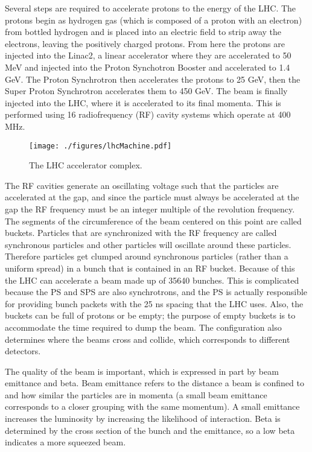 Several steps are required to accelerate protons to the energy of the LHC.  The protons begin as hydrogen gas (which is composed of a proton with an electron) from bottled hydrogen and is placed into an electric field to strip away the electrons, leaving the positively charged protons.  From here the protons are injected into the Linac2, a linear accelerator where they are accelerated to 50 MeV and injected into the Proton Synchotron Booster and accelerated to 1.4 GeV.  The Proton Synchrotron then accelerates the protons to 25 GeV, then the Super Proton Synchrotron accelerates them to 450 GeV.  The beam is finally injected into the LHC, where it is accelerated to its final momenta.  This is performed using 16 radiofrequency (RF) cavity systems which operate at 400 MHz.  

\begin{figure}[h!]
  \centering
	\texttt{[image: ./figures/lhcMachine.pdf]}
\caption{\label{fig:lhcMachine}{ The LHC accelerator complex. }}
\end{figure}

The RF cavities generate an oscillating voltage such that the particles are accelerated at the gap, and since the particle must always be accelerated at the gap the RF frequency must be an integer multiple of the revolution frequency.  The segments of the circumference of the beam centered on this point are called buckets.  Particles that are synchronized with the RF frequency are called synchronous particles and other particles will oscillate around these particles.  Therefore particles get clumped around synchronous particles (rather than a uniform spread) in a bunch that is contained in an RF bucket.  Because of this the LHC can accelerate a beam made up of 35640 bunches.  This is complicated because the PS and SPS are also synchrotrons, and the PS is actually responsible for providing bunch packets with the 25 ns spacing that the LHC uses.  Also, the buckets can be full of protons or be empty; the purpose of empty buckets is to accommodate the time required to dump the beam.  The configuration also determines where the beams cross and collide, which corresponds to different detectors.    %

The quality of the beam is important, which is expressed in part by beam emittance and beta.  Beam emittance refers to the distance a beam is confined to and how similar the particles are in momenta (a small beam emittance corresponds to a closer grouping with the same momentum).  A small emittance increases the luminosity by increasing the likelihood of interaction.  Beta is determined by the cross section of the bunch and the emittance, so a low beta indicates a more squeezed beam.


